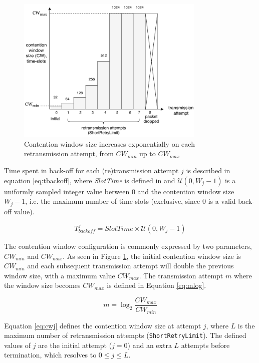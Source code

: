 \begin{figure}
\center
\includegraphics[width=0.8\textwidth]{images/contention-window-sizes.pdf}
\caption{Contention window size increases exponentially on each retransmission attempt, from $\mathit{CW}_{min}$ up to $\mathit{CW}_{max}$}
\label{fig:cwsizes}
\end{figure}

Time spent in back-off for each (re)transmission attempt $j$ is described in
equation \ref{eq:tbackoff}, where \emph{SlotTime} is defined in \cite{654749}
and $\mathcal{U}(0,W_j-1)$ is a uniformly sampled integer value between $0$
and the contention window size $W_{j}-1$, i.e. the maximum number of
time-slots (exclusive, since 0 is a valid back-off value). 

\begin{equation} \label{eq:tbackoff}
T^j_{\mathit{backoff}} = \mathit{SlotTime} \times \mathcal{U}(0,W_j-1)
\end{equation}

The contention window configuration is commonly expressed by two parameters,
$CW_{min}$ and $CW_{max}$. As seen in Figure \ref{fig:cwsizes}, the initial
contention window size is $CW_{min}$ and each subsequent transmission attempt
will double the previous window size, with a maximum value $CW_{max}$. The
transmission attempt $m$ where the window size becomes $\mathit{CW}_{max}$ is
defined in Equation \ref{eq:mlog}.

\begin{equation} \label{eq:mlog}
m = \log_2 \frac{\mathit{CW}_{max}}{\mathit{CW}_{min}}
\end{equation}

Equation \ref{eq:cwj} defines the contention window size at attempt $j$, where
$L$ is the maximum number of retransmission attempts
(\texttt{ShortRetryLimit}). The defined values of $j$ are the initial attempt
($j=0$) and an extra $L$ attempts before termination, which resolves to $0
\leq j \leq L$.


